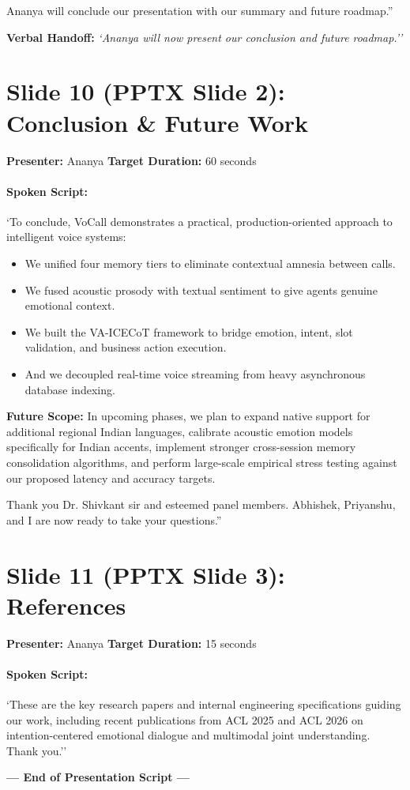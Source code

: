 \documentclass[11pt,a4paper]{article}
\begin{document}
Ananya will conclude our presentation with our summary and future roadmap.''

\noindent\textbf{Verbal Handoff:} \textit{`Ananya will now present our conclusion and future roadmap.''}

\vspace{1.5em}

\section*{Slide 10 (PPTX Slide 2): Conclusion \& Future Work}
\textbf{Presenter:} Ananya \hfill \textbf{Target Duration:} 60 seconds

\paragraph{Spoken Script:}
`To conclude, VoCall demonstrates a practical, production-oriented approach to intelligent voice systems:
\begin{itemize}
    \item We unified four memory tiers to eliminate contextual amnesia between calls.
    \item We fused acoustic prosody with textual sentiment to give agents genuine emotional context.
    \item We built the VA-ICECoT framework to bridge emotion, intent, slot validation, and business action execution.
    \item And we decoupled real-time voice streaming from heavy asynchronous database indexing.
\end{itemize}
\textbf{Future Scope:} In upcoming phases, we plan to expand native support for additional regional Indian languages, calibrate acoustic emotion models specifically for Indian accents, implement stronger cross-session memory consolidation algorithms, and perform large-scale empirical stress testing against our proposed latency and accuracy targets.

Thank you Dr. Shivkant sir and esteemed panel members. Abhishek, Priyanshu, and I are now ready to take your questions.''

\vspace{1.5em}

\section*{Slide 11 (PPTX Slide 3): References}
\textbf{Presenter:} Ananya \hfill \textbf{Target Duration:} 15 seconds

\paragraph{Spoken Script:}
`These are the key research papers and internal engineering specifications guiding our work, including recent publications from ACL 2025 and ACL 2026 on intention-centered emotional dialogue and multimodal joint understanding. Thank you.''

\vspace{2em}
\begin{center}
    \textbf{--- End of Presentation Script ---}
\end{center}
\end{document}
